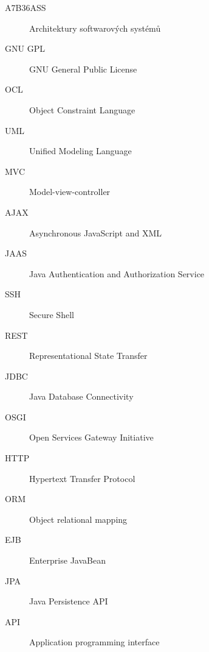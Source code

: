 \documentclass[11pt,twoside,a4paper]{book}
\begin{document}
\begin{description}
\item[A7B36ASS] Architektury softwarových systémů
\item[GNU GPL] GNU General Public License
\item[OCL] Object Constraint Language
\item[UML] Unified Modeling Language
\item[MVC] Model-view-controller
\item[AJAX] Asynchronous JavaScript and XML
\item[JAAS] Java Authentication and Authorization Service
\item[SSH] Secure Shell
\item[REST] Representational State Transfer
\item[JDBC] Java Database Connectivity
\item[OSGI] Open Services Gateway Initiative
\item[HTTP] Hypertext Transfer Protocol
\item[ORM] Object relational mapping
\item[EJB] Enterprise JavaBean
\item[JPA] Java Persistence API
\item[API] Application programming interface

\end{description}


\end{document}
